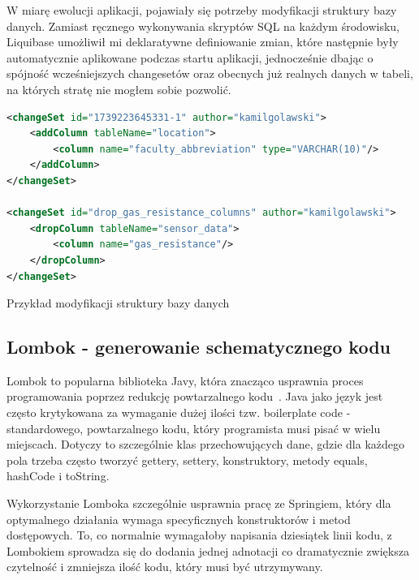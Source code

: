 \documentclass[a4paper,12pt,openany]{book}
\begin{document}
W miarę ewolucji aplikacji, pojawiały się potrzeby modyfikacji struktury bazy danych. Zamiast ręcznego wykonywania skryptów SQL na każdym środowisku, Liquibase umożliwił mi deklaratywne definiowanie zmian, które następnie były automatycznie aplikowane podczas startu aplikacji, jednocześnie dbając o spójność wcześniejszych changesetów oraz obecnych już realnych danych w tabeli, na których stratę nie mogłem sobie pozwolić.

\begin{lstfloat}[htbp]
\begin{lstlisting}[language=xml]
<changeSet id="1739223645331-1" author="kamilgolawski">
    <addColumn tableName="location">
        <column name="faculty_abbreviation" type="VARCHAR(10)"/>
    </addColumn>
</changeSet>

<changeSet id="drop_gas_resistance_columns" author="kamilgolawski">
    <dropColumn tableName="sensor_data">
        <column name="gas_resistance"/>
    </dropColumn>
</changeSet>
\end{lstlisting}
\caption{Przykład modyfikacji struktury bazy danych}
\label{lst:liquibase-modify}
\end{lstfloat}

\vspace{2cm}

\subsection*{Lombok - generowanie schematycznego kodu}

Lombok to popularna biblioteka Javy, która znacząco usprawnia proces programowania poprzez redukcję powtarzalnego kodu~\cite{bib:baeldung2023lombok}. Java jako język jest często krytykowana za wymaganie dużej ilości tzw. boilerplate code - standardowego, powtarzalnego kodu, który programista musi pisać w wielu miejscach. Dotyczy to szczególnie klas przechowujących dane, gdzie dla każdego pola trzeba często tworzyć gettery, settery, konstruktory, metody equals, hashCode i toString.

Wykorzystanie Lomboka szczególnie usprawnia pracę ze Springiem, który dla optymalnego działania wymaga specyficznych konstruktorów i metod dostępowych. To, co normalnie wymagałoby napisania dziesiątek linii kodu, z Lombokiem sprowadza się do dodania jednej adnotacji co dramatycznie zwiększa czytelność i zmniejsza ilość kodu, który musi być utrzymywany.
\end{document}
